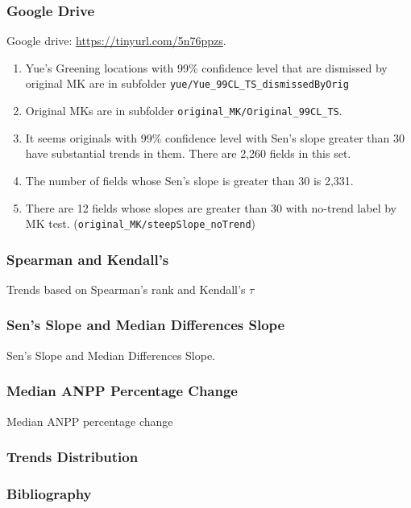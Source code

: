 \documentclass[serif, xcolor={dvipsnames}]{beamer} %
\def\code#1{{\scriptsize\texttt{#1}}}
\begin{document}
\begin{frame}[t]
\frametitle{Google Drive}
Google drive: \url{https://tinyurl.com/5n76ppzs}.
\begin{enumerate}
\item Yue's Greening locations with 99\% confidence level that are dismissed by original MK
are in subfolder \code{yue/Yue\_99CL\_TS\_dismissedByOrig} 
\item Original MKs are in
subfolder \code{original\_MK/Original\_99CL\_TS}.
\item It seems originals with 99\% confidence level with Sen's slope greater than
30 have substantial trends in them. There are 2,260 fields in this set.
\item The number of fields whose Sen's slope is greater than 30 is 2,331.\\
\item There are 12 fields whose slopes are greater than 30 with no-trend label by MK test. (\code{original\_MK/steepSlope\_noTrend})
\end{enumerate}
\end{frame}
\begin{frame}
\frametitle{Spearman and Kendall's}
Trends based on Spearman's rank and Kendall's $\tau$
\centering
\end{frame}
\begin{frame}
\frametitle{Sen's Slope and Median Differences Slope}
Sen's Slope and Median Differences Slope.
\begin{center}
\end{center}
\end{frame}
\begin{frame}
\frametitle{Median ANPP Percentage Change}
Median ANPP percentage change
\begin{center}
\end{center}
\end{frame}
\begin{frame}
\frametitle{Trends Distribution}
\begin{center}
\end{center}
\end{frame}
%        
%         
\begin{frame}
\frametitle{Bibliography}
\printbibliography
\end{frame}
\end{document}
